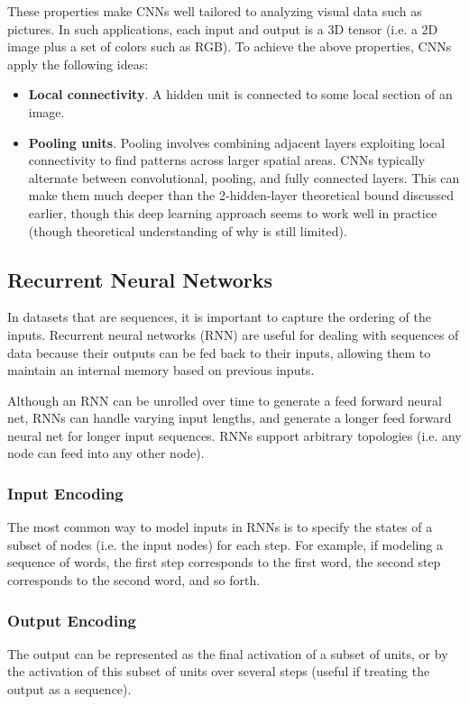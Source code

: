 \documentclass[12pt,titlepage]{article}
\begin{document}
      These properties make CNNs well tailored to analyzing visual data such as pictures. In such applications, each input and output is a 3D tensor (i.e. a 2D image plus a
      set of colors such as RGB). To achieve the above properties, CNNs apply the following ideas:
      \begin{itemize}
        \item \textbf{Local connectivity}. A hidden unit is connected to some local section of an image.
        \item \textbf{Pooling units}. Pooling involves combining adjacent layers exploiting local connectivity to find patterns across larger spatial areas. CNNs typically
          alternate between convolutional, pooling, and fully connected layers. This can make them much deeper than the 2-hidden-layer theoretical bound discussed earlier,
          though this deep learning approach seems to work well in practice (though theoretical understanding of why is still limited).
      \end{itemize}

    \subsection{Recurrent Neural Networks}
      In datasets that are sequences, it is important to capture the ordering of the inputs. Recurrent neural networks (RNN) are useful for dealing with sequences of data
      because their outputs can be fed back to their inputs, allowing them to maintain an internal memory based on previous inputs.

      Although an RNN can be unrolled over time to generate a feed forward neural net, RNNs can handle varying input lengths, and generate a longer feed forward neural net
      for longer input sequences. RNNs support arbitrary topologies (i.e. any node can feed into any other node).

      \subsubsection{Input Encoding}
        The most common way to model inputs in RNNs is to specify the states of a subset of nodes (i.e. the input nodes) for each step. For example, if modeling a sequence of
        words, the first step corresponds to the first word, the second step corresponds to the second word, and so forth.

      \subsubsection{Output Encoding}
        The output can be represented as the final activation of a subset of units, or by the activation of this subset of units over several steps (useful if treating the output
        as a sequence).
\end{document}
